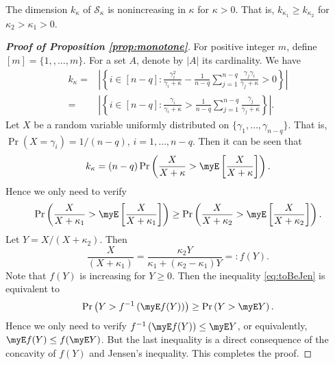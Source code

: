 \begin{proposition}\label{prop:monotone}
    The dimension $k_{\kappa}$ of $\mathcal S_{\kappa}$ is nonincreasing in $\kappa$ for $\kappa>0$.
That is, $k_{\kappa_1} \geq k_{\kappa_2}$ for $ \kappa _2 > \kappa_1 > 0$.
\end{proposition}

\begin{proof}[\textbf{Proof of Proposition \ref{prop:monotone}}]
    For positive integer $m$, define $[m]=\{1,,\ldots, m\}$.
    For a set $A$, denote by $| A |$ its cardinality.
    We have
    \begin{equation*}
        \begin{split}
        k_{\kappa} =& \left|\left\{i\in [n-q]: \frac{\gamma_i^2}{\gamma_i +\kappa} - \frac{1}{n-q} \sum_{j=1}^{n-q}\frac{\gamma_j \gamma_i}{\gamma_j +\kappa}>0 \right\}\right|
        \\
        =& \left|\left\{i\in [n-q]: \frac{\gamma_i}{\gamma_i +\kappa} > \frac{1}{n-q} \sum_{j=1}^{n-q}\frac{\gamma_j }{\gamma_j +\kappa} \right\}\right|
        .
        \end{split}
    \end{equation*}
    Let $X$ be a random variable uniformly distributed on $\{\gamma_1,\ldots,\gamma_{n-q}\}$.
    That is, $\Pr(X=\gamma_i)=1/(n-q)$, $i=1,\ldots, n-q$.
    Then it can be seen that
    \begin{equation*}
        k_{\kappa}=(n-q) \Pr \left(\frac{X}{X+\kappa}>\myE \left[\frac{X}{X+\kappa}\right]\right).
    \end{equation*}
    Hence we only need to verify
    \begin{equation}\label{eq:toBeJen}
        \Pr \left(\frac{X}{X+\kappa_1}>\myE \left[\frac{X}{X+\kappa_1}\right]\right) 
\geq
\Pr \left(\frac{X}{X+\kappa_2}>\myE \left[\frac{X}{X+\kappa_2}\right]\right) .
    \end{equation}
    Let $Y=X/(X+\kappa_2)$.
    Then
    \begin{equation*}
        \frac{X}{(X+\kappa_1)} = \frac{\kappa_2 Y}{ \kappa_1 + (\kappa_2-\kappa_1) Y} =: f(Y).
    \end{equation*}
    Note that $f(Y)$ is increasing for $Y\geq 0$.
    Then the inequality \eqref{eq:toBeJen} is equivalent to
    \begin{equation*}
        \Pr \left(Y> f^{-1}\left(\myE f(Y)\right)\right) 
\geq
\Pr \left( Y >\myE Y\right) .
    \end{equation*}
    Hence we only need to verify
        $f^{-1}\left(\myE f(Y)\right)
        \leq
        \myE Y$, or equivalently, $\myE f(Y)
        \leq
        f(\myE Y)$.
        But the last inequality is a direct consequence of the concavity of $f(Y)$ and Jensen's inequality.
        This completes the proof.

\end{proof}
